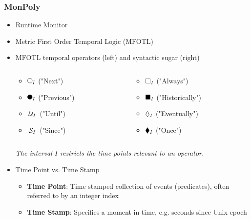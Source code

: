 \begin{frame}
    \frametitle{MonPoly}
    \begin{itemize}
        \item Runtime Monitor
        \item Metric First Order Temporal Logic (MFOTL)
        \item MFOTL temporal operators (left) and syntactic sugar (right)
        \begin{columns}
            \begin{column}{0.4\textwidth}
                \begin{itemize}
                    \item $\Next{I}$ ("Next")
                    \item $\Previous{I}$ ("Previous")
                    \item $\,\mathcal{U}_{I}\,$ ("Until")
                    \item $\,\mathcal{S}_{I}\,$ ("Since")
                \end{itemize}
            \end{column}
            \begin{column}{0.4\textwidth}
                \begin{itemize}
                    \item $\square_{I}$ ("Always")
                    \item $\blacksquare_{I}$ ("Historically")
                    \item $\lozenge_{I}$ ("Eventually")
                    \item $\blacklozenge_{I}$ ("Once")
                \end{itemize}
            \end{column}
        \end{columns}
        \vspace{.2cm}
        \textit{The interval $I$ restricts the time points relevant to an operator.}
        \item Time Point vs. Time Stamp
        \begin{itemize}
            \item \textbf{Time Point}: Time stamped collection of events (predicates), often referred to by an integer index
            \item \textbf{Time Stamp}: Specifies a moment in time, e.g. seconds since Unix epoch
        \end{itemize}

    \end{itemize}
\end{frame}

